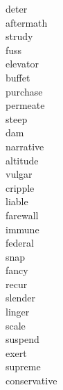 \documentclass[a4paper, 10pt]{ctexart}
\begin{document}
\begin{multicols*}{2}
\begin{description}
\item[deter]

\item[aftermath]

\item[strudy]

\item[fuss]

\item[elevator]

\item[buffet]

\item[purchase]

\item[permeate]

\item[steep]

\item[dam]

\item[narrative]

\item[altitude]

\item[vulgar]

\item[cripple]

\item[liable]

\item[farewall]

\item[immune]

\item[federal]

\item[snap]

\item[fancy]

\item[recur]

\item[slender]

\item[linger]

\item[scale]

\item[suspend]

\item[exert]

\item[supreme]

\item[conservative]


\end{description}
\end{multicols*}
\end{document}
